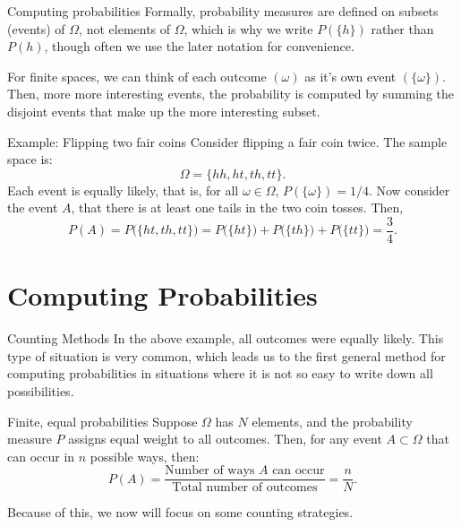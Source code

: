 \begin{frame}[allowframebreaks]{Computing probabilities}
  Formally, probability measures are defined on subsets (events) of $\Omega$, not elements of $\Omega$, which is why we write $P(\{h\})$ rather than $P(h)$, though often we use the later notation for convenience.
  
  For finite spaces, we can think of each outcome $(\omega)$ as it's own event $(\{\omega\})$. Then, more more interesting events, the probability is computed by summing the disjoint events that make up the more interesting subset.
  
  \begin{exampleblock}{Example: Flipping two fair coins}
    Consider flipping a fair coin twice. The sample space is:
    $$
    \Omega = \{hh, ht, th, tt\}.
    $$
    Each event is equally likely, that is, for all $\omega \in \Omega$, $P(\{\omega\}) = 1/4$. Now consider the event $A$, that there is at least one tails in the two coin tosses. Then, 
    $$
    P(A) = P\big(\{ht, th, tt\}\big) = P\big(\{ht\}\big) + P\big(\{th\}\big) + P\big(\{tt\}\big) = \frac{3}{4}.
    $$
  \end{exampleblock}
\end{frame}

\section{Computing Probabilities}

\begin{frame}{Counting Methods}
  In the above example, all outcomes were equally likely. This type of situation is very common, which leads us to the first general method for computing probabilities in situations where it is not so easy to write down all possibilities.
  \begin{block}{Finite, equal probabilities}
    Suppose $\Omega$ has $N$ elements, and the probability measure $P$ assigns equal weight to all outcomes. Then, for any event $A \subset \Omega$ that can occur in $n$ possible ways, then:
    $$
    P(A) = \frac{\text{Number of ways } A \text{ can occur}}{\text{Total number of outcomes}} = \frac{n}{N}.
    $$
  \end{block}
  
  Because of this, we now will focus on some counting strategies.
  
\end{frame}

